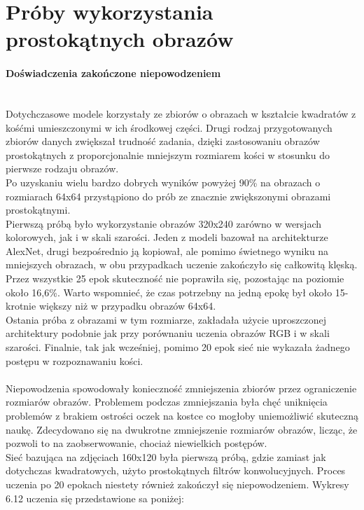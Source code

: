 \section{Próby wykorzystania prostokątnych obrazów}

\paragraph{Doświadczenia zakończone niepowodzeniem} \mbox{}\\
Dotychczasowe modele korzystały ze zbiorów o obrazach w kształcie kwadratów z kośćmi
umieszczonymi w ich środkowej części. Drugi rodzaj przygotowanych zbiorów danych zwiększał
trudność zadania, dzięki zastosowaniu obrazów prostokątnych z proporcjonalnie mniejszym
rozmiarem kości w stosunku do pierwsze rodzaju obrazów.\\
Po uzyskaniu wielu bardzo dobrych wyników powyżej 90\% na obrazach o rozmiarach 64x64
przystąpiono do prób ze znacznie zwiększonymi obrazami prostokątnymi.\\
Pierwszą próbą było wykorzystanie obrazów 320x240 zarówno w wersjach kolorowych, jak i w skali szarości.
Jeden z modeli bazował na architekturze AlexNet, drugi bezpośrednio
ją kopiował, ale pomimo świetnego wyniku na mniejszych obrazach, w obu przypadkach
uczenie zakończyło się całkowitą klęską. Przez wszystkie 25 epok skuteczność nie poprawiła się,
pozostając na poziomie około 16,6\%. Warto wspomnieć, że czas potrzebny na
jedną epokę był około 15-krotnie większy niż w przypadku obrazów 64x64.\\
Ostania próba z obrazami w tym rozmiarze, zakładała użycie uproszczonej architektury
podobnie jak przy porównaniu uczenia obrazów RGB i w skali szarości. Finalnie, tak jak
wcześniej, pomimo 20 epok sieć nie wykazała żadnego postępu w rozpoznawaniu kości.\\\\
Niepowodzenia spowodowały konieczność zmniejszenia zbiorów przez ograniczenie rozmiarów obrazów.
Problemem podczas zmniejszania była chęć uniknięcia problemów z brakiem ostrości
oczek na kostce co mogłoby uniemożliwić skuteczną naukę. Zdecydowano się na dwukrotne
zmniejszenie rozmiarów obrazów, licząc, że pozwoli to na zaobserwowanie, chociaż niewielkich
postępów.\\
Sieć bazująca na zdjęciach 160x120 była pierwszą próbą, gdzie zamiast jak dotychczas
kwadratowych, użyto prostokątnych filtrów konwolucyjnych. Proces uczenia po 20 epokach
niestety również zakończył się niepowodzeniem. Wykresy 6.12 uczenia się przedstawione sa poniżej: \newpage

